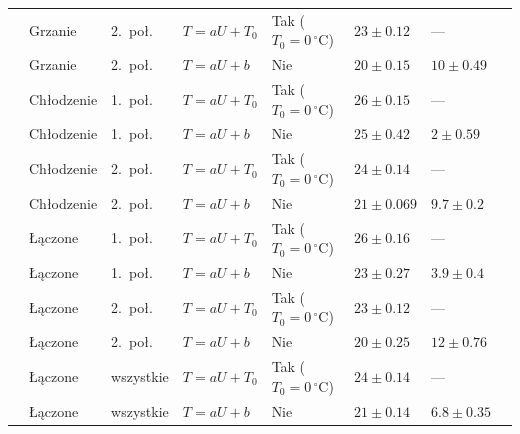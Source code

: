 \documentclass[12pt, a4paper]{article}
\begin{document}
\begin{table}[H]
{\begin{tabular}{llllllll}
                    & Grzanie    & 2.\ poł.  & $T = aU + T_0$             & Tak ($T_0 = 0\,^\circ\mathrm{C}$) & $\num{23}   \pm \num{0.12}$     & ---                             \\
                    & Grzanie    & 2.\ poł.  & $T = aU + b$               & Nie                               & $\num{20}   \pm \num{0.15}$     & $\num{10}  \pm \num{0.49}$      \\
                    & Chłodzenie & 1.\ poł.  & $T = aU + T_0$             & Tak ($T_0 = 0\,^\circ\mathrm{C}$) & $\num{26}   \pm \num{0.15}$     & ---                             \\
                    & Chłodzenie & 1.\ poł.  & $T = aU + b$               & Nie                               & $\num{25}   \pm \num{0.42}$     & $\num{2}   \pm \num{0.59}$      \\
                    & Chłodzenie & 2.\ poł.  & $T = aU + T_0$             & Tak ($T_0 = 0\,^\circ\mathrm{C}$) & $\num{24}   \pm \num{0.14}$     & ---                             \\
                    & Chłodzenie & 2.\ poł.  & $T = aU + b$               & Nie                               & $\num{21}   \pm \num{0.069}$    & $\num{9.7} \pm \num{0.2}$       \\
                    & Łączone    & 1.\ poł.  & $T = aU + T_0$             & Tak ($T_0 = 0\,^\circ\mathrm{C}$) & $\num{26}   \pm \num{0.16}$     & ---                             \\
                    & Łączone    & 1.\ poł.  & $T = aU + b$               & Nie                               & $\num{23}   \pm \num{0.27}$     & $\num{3.9} \pm \num{0.4}$       \\
                    & Łączone    & 2.\ poł.  & $T = aU + T_0$             & Tak ($T_0 = 0\,^\circ\mathrm{C}$) & $\num{23}   \pm \num{0.12}$     & ---                             \\
                    & Łączone    & 2.\ poł.  & $T = aU + b$               & Nie                               & $\num{20}   \pm \num{0.25}$     & $\num{12}  \pm \num{0.76}$      \\
                    & Łączone    & wszystkie & $T = aU + T_0$             & Tak ($T_0 = 0\,^\circ\mathrm{C}$) & $\num{24}   \pm \num{0.14}$     & ---                             \\
                    & Łączone    & wszystkie & $T = aU + b$               & Nie                               & $\num{21}   \pm \num{0.14}$     & $\num{6.8} \pm \num{0.35}$      \\
            \bottomrule
        \end{tabular}%
    }
\end{table}
\end{document}
